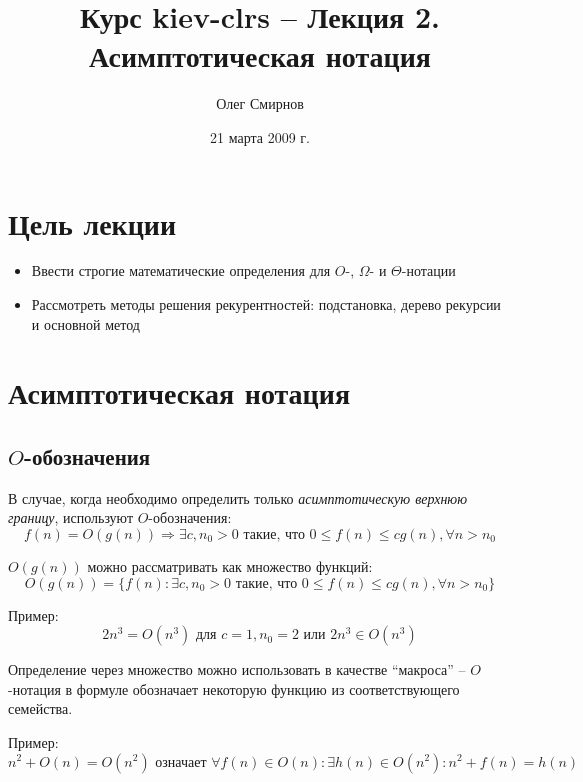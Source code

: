 \documentclass[11pt]{article}
\author{Олег Смирнов}
\title{Курс kiev-clrs -- Лекция 2. Асимптотическая нотация}
\date{21 марта 2009 г.}
\begin{document}
\maketitle
\tableofcontents

\newpage
\setlength{\parskip}{1ex plus 0.5ex minus 0.2ex}
\section{Цель лекции}
\begin{itemize}
\item Ввести строгие математические определения для $O$-, $\Omega$- и $\Theta$-нотации 
\item Рассмотреть методы решения рекурентностей: подстановка, дерево рекурсии и основной метод
\end{itemize}

\section{Асимптотическая нотация}

\subsection{$O$-обозначения}
В случае, когда необходимо определить только \emph{асимптотическую верхнюю границу}, используют $O$-обозначения:
\begin{equation*}
  f(n) = O(g(n)) \Rightarrow \exists c, n_0 > 0 \text{ такие, что }
  0 \leqslant f(n) \leqslant c g(n), \forall n > n_0
\end{equation*}

$O(g(n))$ можно рассматривать как множество функций:
\begin{equation*}
  O(g(n)) = \{f(n): \exists c, n_0 > 0 \text{ такие, что }
  0 \leqslant f(n) \leqslant c g(n), \forall n > n_0
  \}
\end{equation*}

Пример:
\begin{equation*}
  2n^3 = O(n^3) \text{ для } c = 1, n_0 = 2 \text{ или } 2n^3 \in O(n^3)
\end{equation*}

Определение через множество можно использовать в качестве ``макроса''
-- $O$-нотация в формуле обозначает некоторую функцию из соответствующего семейства.

Пример:
\begin{equation*}
  n^2 + O(n) = O(n^2) \text{ означает } \forall f(n) \in O(n): \exists h(n) \in O(n^2): n^2 + f(n) = h(n)
\end{equation*}
\end{document}

